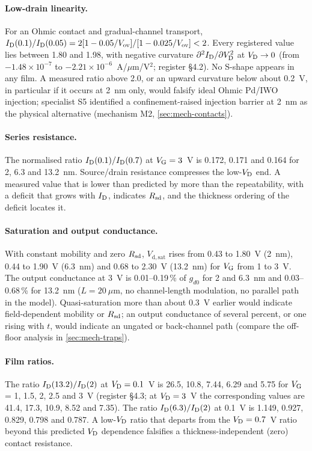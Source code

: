 \paragraph{Low-drain linearity.} For an Ohmic contact and gradual-channel transport, $I_{\mathrm{D}}(0.1)/I_{\mathrm{D}}(0.05) = 2[1-0.05/V_{\mathrm{ov}}]/[1-0.025/V_{\mathrm{ov}}] < 2$. Every registered value lies between 1.80 and 1.98, with negative curvature $\partial^2I_{\mathrm{D}}/\partial V_{\mathrm{D}}^2$ at $V_{\mathrm{D}}\rightarrow 0$ (from $-1.48\times10^{-7}$ to $-2.21\times10^{-6}$~A/$\mu$m/V$^2$; register \S 4.2). No S-shape appears in any film. A measured ratio above 2.0, or an upward curvature below about 0.2~V, in particular if it occurs at 2~nm only, would falsify ideal Ohmic Pd/IWO injection; specialist S5 identified a confinement-raised injection barrier at 2~nm as the physical alternative (mechanism M2, \cref{sec:mech-contacts}).

\paragraph{Series resistance.} The normalised ratio $I_{\mathrm{D}}(0.1)/I_{\mathrm{D}}(0.7)$ at $V_{\mathrm{G}} = 3$~V is 0.172, 0.171 and 0.164 for 2, 6.3 and 13.2~nm. Source/drain resistance compresses the low-$V_{\mathrm{D}}$ end. A measured value that is lower than predicted by more than the repeatability, with a deficit that grows with $I_{\mathrm{D}}$, indicates $R_{\mathrm{sd}}$, and the thickness ordering of the deficit locates it.

\paragraph{Saturation and output conductance.} With constant mobility and zero $R_{\mathrm{sd}}$, $V_{\mathrm{d,sat}}$ rises from 0.43 to 1.80~V (2~nm), 0.44 to 1.90~V (6.3~nm) and 0.68 to 2.30~V (13.2~nm) for $V_{\mathrm{G}}$ from 1 to 3~V. The output conductance at 3~V is 0.01--0.19\,\% of $g_{d0}$ for 2 and 6.3~nm and 0.03--0.68\,\% for 13.2~nm ($L = 20~\mu$m, no channel-length modulation, no parallel path in the model). Quasi-saturation more than about 0.3~V earlier would indicate field-dependent mobility or $R_{\mathrm{sd}}$; an output conductance of several percent, or one rising with $t$, would indicate an ungated or back-channel path (compare the off-floor analysis in \cref{sec:mech-traps}).

\paragraph{Film ratios.} The ratio $I_{\mathrm{D}}(13.2)/I_{\mathrm{D}}(2)$ at $V_{\mathrm{D}} = 0.1$~V is 26.5, 10.8, 7.44, 6.29 and 5.75 for $V_{\mathrm{G}}$ = 1, 1.5, 2, 2.5 and 3~V (register \S 4.3; at $V_{\mathrm{D}} = 3$~V the corresponding values are 41.4, 17.3, 10.9, 8.52 and 7.35). The ratio $I_{\mathrm{D}}(6.3)/I_{\mathrm{D}}(2)$ at 0.1~V is 1.149, 0.927, 0.829, 0.798 and 0.787. A low-$V_{\mathrm{D}}$ ratio that departs from the $V_{\mathrm{D}} = 0.7$~V ratio beyond this predicted $V_{\mathrm{D}}$ dependence falsifies a thickness-independent (zero) contact resistance.

